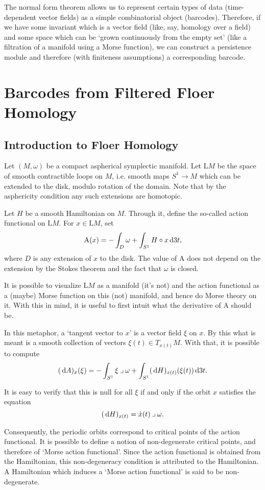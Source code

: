 \documentclass{article}
\theoremstyle{nonumberplain}
\newcommand{\LL}{\mathrm{L}}
\renewcommand{\AA}{\mathrm{A}}
\newcommand{\into}{\mathbin{\lrcorner}}
\begin{document}
The normal form theorem allows us to represent certain types of data (time-dependent vector fields) as a simple combinatorial object (barcodes). Therefore, if we have some invariant which is a vector field (like, say, homology over a field) and some space which can be `grown continuously from the empty set' (like a filtration of a manifold using a Morse function), we can construct a persistence module and therefore (with finiteness assumptions) a corresponding barcode.

\section{Barcodes from Filtered Floer Homology}

\subsection{Introduction to Floer Homology}

Let $(M, \omega)$ be a compact aspherical symplectic manifold. Let $\LL M$ be the space of smooth contractible loops on $M$, i.e. smooth maps $S^1 \to M$ which can be extended to the disk, modulo rotation of the domain. Note that by the asphericity condition any such extensions are homotopic.

Let $H$ be a smooth Hamiltonian on $M$. Through it, define the so-called action functional on $\LL M$. For $x \in \LL M$, set
\[\AA(x) = - \int_D \omega + \int_{S^1} H \circ x \dl3 t,\]
where $D$ is any extension of $x$ to the disk. The value of $\AA$ does not depend on the extension by the Stokes theorem and the fact that $\omega$ is closed.

It is possible to visualize $\LL M$ as a manifold (it's not) and the action functional as a (maybe) Morse function on this (not) manifold, and hence do Morse theory on it. With this in mind, it is useful to first intuit what the derivative of $\AA$ should be.

In this metaphor, a `tangent vector to $x$' is a vector field $\xi$ on $x$. By this what is meant is a smooth collection of vectors $\xi(t) \in T_{x(t)} M$. With that, it is possible to compute
\[ (\dl A)_x(\xi) = - \int_{S^1} \xi \into \omega + \int_{S^1} (\dl H)_{x(t)} (\xi(t)) \dl3t. \]

It is easy to verify that this is null for all $\xi$ if and only if the orbit $x$ satisfies the equation
\[(\dl H)_{x(t)} = \dot x(t) \into \omega.\]

Consequently, the periodic orbits correspond to critical points of the action functional. It is possible to define a notion of non-degenerate critical points, and therefore of `Morse action functional'. Since the action functional is obtained from the Hamiltonian, this non-degeneracy condition is attributed to the Hamiltonian. A Hamiltonian which induces a `Morse action functional' is said to be non-degenerate.
\end{document}

